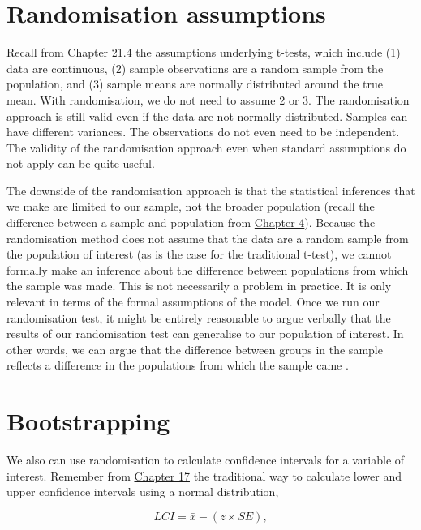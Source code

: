 \documentclass[
]{scrbook}
\begin{document}
\hypertarget{randomisation-assumptions}{%
\section{Randomisation assumptions}\label{randomisation-assumptions}}

Recall from \protect\hyperlink{assumptions-of-t-tests}{Chapter 21.4} the assumptions underlying t-tests, which include (1) data are continuous, (2) sample observations are a random sample from the population, and (3) sample means are normally distributed around the true mean.
With randomisation, we do not need to assume 2 or 3.
The randomisation approach is still valid even if the data are not normally distributed.
Samples can have different variances.
The observations do not even need to be independent.
The validity of the randomisation approach even when standard assumptions do not apply can be quite useful.

The downside of the randomisation approach is that the statistical inferences that we make are limited to our sample, not the broader population (recall the difference between a sample and population from \protect\hyperlink{Chapter_4}{Chapter 4}).
Because the randomisation method does not assume that the data are a random sample from the population of interest (as is the case for the traditional t-test), we cannot formally make an inference about the difference between populations from which the sample was made.
This is not necessarily a problem in practice.
It is only relevant in terms of the formal assumptions of the model.
Once we run our randomisation test, it might be entirely reasonable to argue verbally that the results of our randomisation test can generalise to our population of interest.
In other words, we can argue that the difference between groups in the sample reflects a difference in the populations from which the sample came \citep{Ludbrook1998, Ernst2004}.

\hypertarget{bootstrapping}{%
\section{Bootstrapping}\label{bootstrapping}}

We also can use randomisation to calculate confidence intervals for a variable of interest. Remember from \protect\hyperlink{Chapter_17}{Chapter 17} the traditional way to calculate lower and upper confidence intervals using a normal distribution,

\[LCI = \bar{x} - (z \times SE),\]
\end{document}
